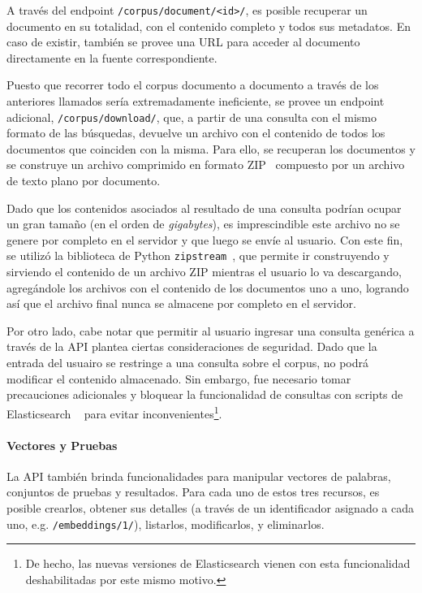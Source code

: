 A través del endpoint \texttt{/corpus/document/<id>/}, es posible recuperar un documento en su
totalidad, con el contenido completo y todos sus metadatos. En caso de existir, también se provee
una URL para acceder al documento directamente en la fuente correspondiente.

Puesto que recorrer todo el corpus documento a documento a través de los anteriores llamados sería
extremadamente ineficiente, se provee un endpoint adicional, \texttt{/corpus/download/}, que, a
partir de una consulta con el mismo formato de las búsquedas, devuelve un archivo con el contenido
de todos los documentos que coinciden con la misma. Para ello, se recuperan los documentos y se
construye un archivo comprimido en formato ZIP~\cite{ZIPFormat} compuesto por un archivo de texto
plano por documento.

Dado que los contenidos asociados al resultado de una consulta podrían ocupar un gran tamaño (en el
orden de \textit{gigabytes}), es imprescindible este archivo no se genere por completo en el
servidor y que luego se envíe al usuario. Con este fin, se utilizó la biblioteca de Python
\texttt{zipstream}~\cite{zipstream}, que permite ir construyendo y sirviendo el contenido de un archivo
ZIP mientras el usuario lo va descargando, agregándole los archivos con el contenido de los documentos
uno a uno, logrando así que el archivo final nunca se almacene por completo en el servidor.

Por otro lado, cabe notar que permitir al usuario ingresar una consulta genérica a través de la API
plantea ciertas consideraciones de seguridad. Dado que la entrada del usuairo se restringe a una
consulta sobre el corpus, no podrá modificar el contenido almacenado. Sin embargo, fue necesario
tomar precauciones adicionales y bloquear la funcionalidad de consultas con scripts de Elasticsearch
~\cite{ElasticsearchScripting} para evitar inconvenientes\footnote{De hecho, las nuevas versiones de
Elasticsearch vienen con esta funcionalidad deshabilitadas por este mismo motivo.}.


\paragraph{Vectores y Pruebas}

La API también brinda funcionalidades para manipular vectores de palabras, conjuntos de pruebas y
resultados. Para cada uno de estos tres recursos, es posible crearlos, obtener sus detalles (a
través de un identificador asignado a cada uno, e.g. \texttt{/embeddings/1/}), listarlos,
modificarlos, y eliminarlos.

